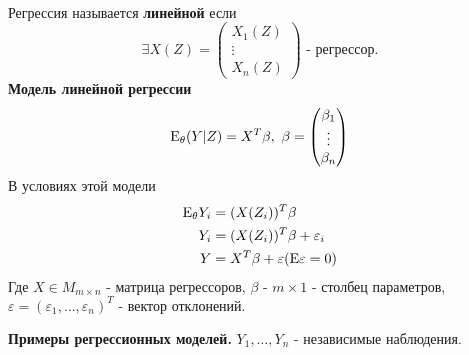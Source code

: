 \documentclass[main.tex]{subfiles}
\begin{document}
\begin{definition} ~\\
	Регрессия называется \textbf{линейной} если
	\[\exists X(Z)=
		\begin{pmatrix}
		X_1(Z)\\
		\vdots\\
		X_n(Z)
		\end{pmatrix}
		\text{ - регрессор.} 
	\]
	\textbf{Модель линейной регрессии}
	\[\mathrm{E}_\theta(Y|Z) = X^T\beta,\ \beta =
		\begin{pmatrix}
			\beta_1\\
			\vdots\\
			\beta_n
		\end{pmatrix}
	\]
	В условиях этой модели
	\begin{align*}
		\mathrm{E}_\theta Y_i &= (X(Z_i))^T\beta\\
		Y_i &= (X(Z_i))^T\beta + \varepsilon_i\\
		Y &= X^T\beta + \varepsilon (\mathrm{E}\varepsilon = 0)\\
	\end{align*}
	Где $X \in M_{m\times n}$ - матрица регрессоров, $\beta$ - $m \times 1$ - столбец параметров, $\varepsilon = (\varepsilon_1,\dots,\varepsilon_n)^T\text{ - вектор отклонений.}$
\end{definition}
\textbf{Примеры регрессионных моделей.}
$Y_1,\dots,Y_n$ - независимые наблюдения.
\end{document}
